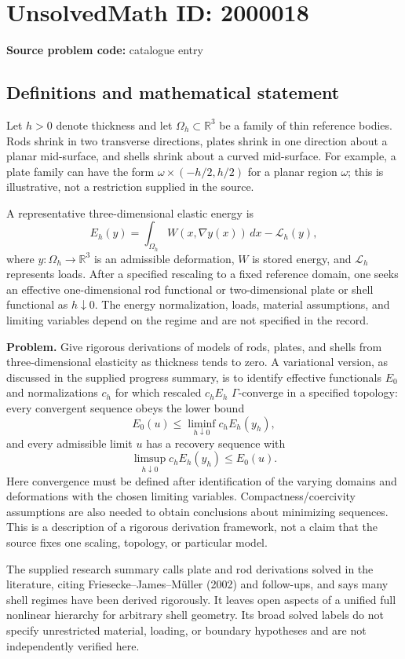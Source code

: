 \documentclass[11pt]{article}
\newcommand{\R}{\mathbb{R}}
\begin{document}
\section*{UnsolvedMath ID: 2000018}
\textbf{Source problem code:} catalogue entry
\subsection{Definitions and mathematical statement}
Let $h>0$ denote thickness and let $\Omega_h\subset\R^3$ be a family of thin reference bodies. Rods shrink in two transverse directions, plates shrink in one direction about a planar mid-surface, and shells shrink about a curved mid-surface. For example, a plate family can have the form $\omega\times(-h/2,h/2)$ for a planar region $\omega$; this is illustrative, not a restriction supplied in the source.

A representative three-dimensional elastic energy is
\[
 E_h(y)=\int_{\Omega_h}W(x,\nabla y(x))\,dx-\mathcal L_h(y),
\]
where $y:\Omega_h\to\R^3$ is an admissible deformation, $W$ is stored energy, and $\mathcal L_h$ represents loads. After a specified rescaling to a fixed reference domain, one seeks an effective one-dimensional rod functional or two-dimensional plate or shell functional as $h\downarrow0$. The energy normalization, loads, material assumptions, and limiting variables depend on the regime and are not specified in the record.

\textbf{Problem.} Give rigorous derivations of models of rods, plates, and shells from three-dimensional elasticity as thickness tends to zero. A variational version, as discussed in the supplied progress summary, is to identify effective functionals $E_0$ and normalizations $c_h$ for which rescaled $c_hE_h$ $\Gamma$-converge in a specified topology: every convergent sequence obeys the lower bound
\[
 E_0(u)\leq\liminf_{h\downarrow0}c_hE_h(y_h),
\]
and every admissible limit $u$ has a recovery sequence with
\[
 \limsup_{h\downarrow0}c_hE_h(y_h)\leq E_0(u).
\]
Here convergence must be defined after identification of the varying domains and deformations with the chosen limiting variables. Compactness/coercivity assumptions are also needed to obtain conclusions about minimizing sequences. This is a description of a rigorous derivation framework, not a claim that the source fixes one scaling, topology, or particular model.

The supplied research summary calls plate and rod derivations solved in the literature, citing Friesecke--James--M\"uller (2002) and follow-ups, and says many shell regimes have been derived rigorously. It leaves open aspects of a unified full nonlinear hierarchy for arbitrary shell geometry. Its broad solved labels do not specify unrestricted material, loading, or boundary hypotheses and are not independently verified here.
\end{document}
